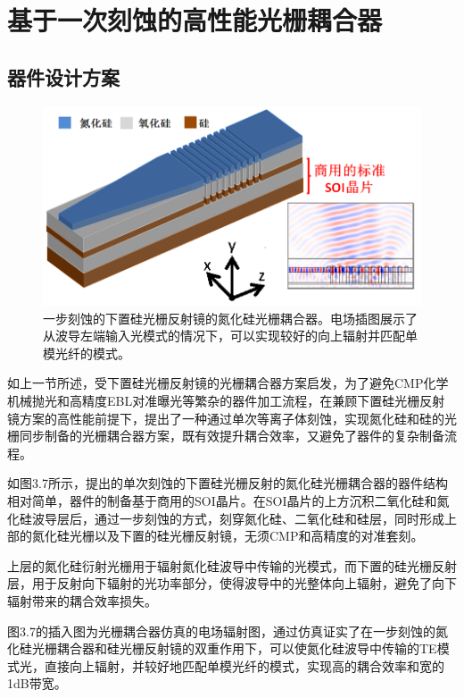 \section{基于一次刻蚀的高性能光栅耦合器}

\subsection{器件设计方案}

\begin{figure}[!htbp]
    \centering
    \includegraphics[width=1\textwidth]{Img/3-7.png}
    \caption{一步刻蚀的下置硅光栅反射镜的氮化硅光栅耦合器。电场插图展示了从波导左端输入光模式的情况下，可以实现较好的向上辐射并匹配单模光纤的模式。}
    \label{fig:3-7}
\end{figure}
如上一节所述，受下置硅光栅反射镜的光栅耦合器方案启发，为了避免CMP化学机械抛光和高精度EBL对准曝光等繁杂的器件加工流程，在兼顾下置硅光栅反射镜方案的高性能前提下，提出了一种通过单次等离子体刻蚀，实现氮化硅和硅的光栅同步制备的光栅耦合器方案，既有效提升耦合效率，又避免了器件的复杂制备流程。

如图3.7所示，提出的单次刻蚀的下置硅光栅反射的氮化硅光栅耦合器的器件结构相对简单，器件的制备基于商用的SOI晶片。在SOI晶片的上方沉积二氧化硅和氮化硅波导层后，通过一步刻蚀的方式，刻穿氮化硅、二氧化硅和硅层，同时形成上部的氮化硅光栅以及下置的硅光栅反射镜，无须CMP和高精度的对准套刻。

上层的氮化硅衍射光栅用于辐射氮化硅波导中传输的光模式，而下置的硅光栅反射层，用于反射向下辐射的光功率部分，使得波导中的光整体向上辐射，避免了向下辐射带来的耦合效率损失。

图3.7的插入图为光栅耦合器仿真的电场辐射图，通过仿真证实了在一步刻蚀的氮化硅光栅耦合器和硅光栅反射镜的双重作用下，可以使氮化硅波导中传输的TE模式光，直接向上辐射，并较好地匹配单模光纤的模式，实现高的耦合效率和宽的1dB带宽。

